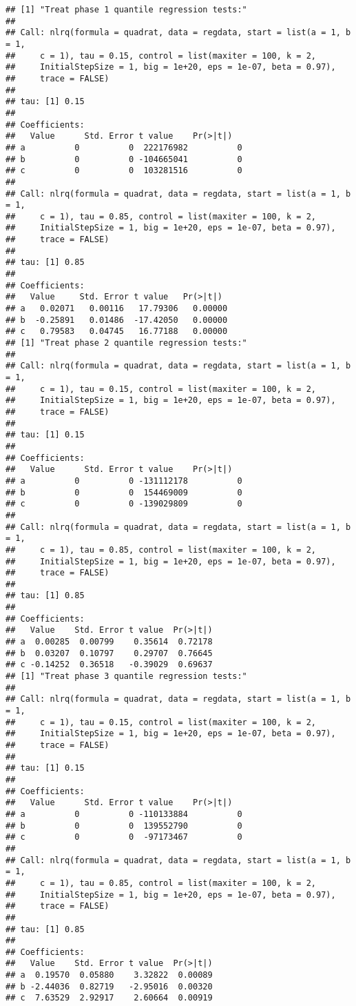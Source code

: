 \documentclass[
]{article}
\begin{document}
\begin{verbatim}
## [1] "Treat phase 1 quantile regression tests:"
## 
## Call: nlrq(formula = quadrat, data = regdata, start = list(a = 1, b = 1, 
##     c = 1), tau = 0.15, control = list(maxiter = 100, k = 2, 
##     InitialStepSize = 1, big = 1e+20, eps = 1e-07, beta = 0.97), 
##     trace = FALSE)
## 
## tau: [1] 0.15
## 
## Coefficients:
##   Value      Std. Error t value    Pr(>|t|)  
## a          0          0  222176982          0
## b          0          0 -104665041          0
## c          0          0  103281516          0
## 
## Call: nlrq(formula = quadrat, data = regdata, start = list(a = 1, b = 1, 
##     c = 1), tau = 0.85, control = list(maxiter = 100, k = 2, 
##     InitialStepSize = 1, big = 1e+20, eps = 1e-07, beta = 0.97), 
##     trace = FALSE)
## 
## tau: [1] 0.85
## 
## Coefficients:
##   Value     Std. Error t value   Pr(>|t|) 
## a   0.02071   0.00116   17.79306   0.00000
## b  -0.25891   0.01486  -17.42050   0.00000
## c   0.79583   0.04745   16.77188   0.00000
## [1] "Treat phase 2 quantile regression tests:"
## 
## Call: nlrq(formula = quadrat, data = regdata, start = list(a = 1, b = 1, 
##     c = 1), tau = 0.15, control = list(maxiter = 100, k = 2, 
##     InitialStepSize = 1, big = 1e+20, eps = 1e-07, beta = 0.97), 
##     trace = FALSE)
## 
## tau: [1] 0.15
## 
## Coefficients:
##   Value      Std. Error t value    Pr(>|t|)  
## a          0          0 -131112178          0
## b          0          0  154469009          0
## c          0          0 -139029809          0
## 
## Call: nlrq(formula = quadrat, data = regdata, start = list(a = 1, b = 1, 
##     c = 1), tau = 0.85, control = list(maxiter = 100, k = 2, 
##     InitialStepSize = 1, big = 1e+20, eps = 1e-07, beta = 0.97), 
##     trace = FALSE)
## 
## tau: [1] 0.85
## 
## Coefficients:
##   Value    Std. Error t value  Pr(>|t|)
## a  0.00285  0.00799    0.35614  0.72178
## b  0.03207  0.10797    0.29707  0.76645
## c -0.14252  0.36518   -0.39029  0.69637
## [1] "Treat phase 3 quantile regression tests:"
## 
## Call: nlrq(formula = quadrat, data = regdata, start = list(a = 1, b = 1, 
##     c = 1), tau = 0.15, control = list(maxiter = 100, k = 2, 
##     InitialStepSize = 1, big = 1e+20, eps = 1e-07, beta = 0.97), 
##     trace = FALSE)
## 
## tau: [1] 0.15
## 
## Coefficients:
##   Value      Std. Error t value    Pr(>|t|)  
## a          0          0 -110133884          0
## b          0          0  139552790          0
## c          0          0  -97173467          0
## 
## Call: nlrq(formula = quadrat, data = regdata, start = list(a = 1, b = 1, 
##     c = 1), tau = 0.85, control = list(maxiter = 100, k = 2, 
##     InitialStepSize = 1, big = 1e+20, eps = 1e-07, beta = 0.97), 
##     trace = FALSE)
## 
## tau: [1] 0.85
## 
## Coefficients:
##   Value    Std. Error t value  Pr(>|t|)
## a  0.19570  0.05880    3.32822  0.00089
## b -2.44036  0.82719   -2.95016  0.00320
## c  7.63529  2.92917    2.60664  0.00919
\end{verbatim}
\end{document}
